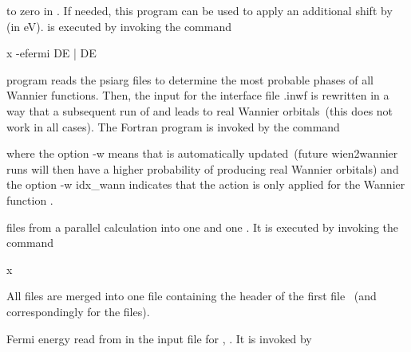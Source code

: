to zero in .  If needed, this program can be used to
apply an additional shift by  (in eV).   is
executed by invoking the command
%
\begin{usage}
  x \shifteig [-up|-dn] -efermi DE |
  \shifteig {} DE
\end{usage}



program reads the psiarg files to determine the most probable phases
of all Wannier functions. Then, the input for the interface file
\case.inwf is rewritten in a way that a subsequent run of \wtow and
\wannier leads to real Wannier orbitals~(this does not work in all
cases). The Fortran program  is invoked by the command
%
\begin{usage}
  \rephase \case [-w] [-up/-dn] [-wf=idx\_wann]
\end{usage}
%
where the option -w means that  is automatically
updated~(future wien2wannier runs will then have a higher probability
of producing real Wannier orbitals) and the option -w idx\_wann
indicates that the action is only applied for the Wannier function
.



 files from a parallel calculation into one
 and one .  It is executed by
invoking the command
%
\begin{usage}
  x \joinvec [-up|-dn -c -so]
\end{usage}
%
All  files are merged into one  file
containing the header of the first file ~(and
correspondingly for the  files).



Fermi energy read from  in the input file for
, . It is invoked by
%
\begin{usage}
  \writeinsp [-up/-dn]
\end{usage}




